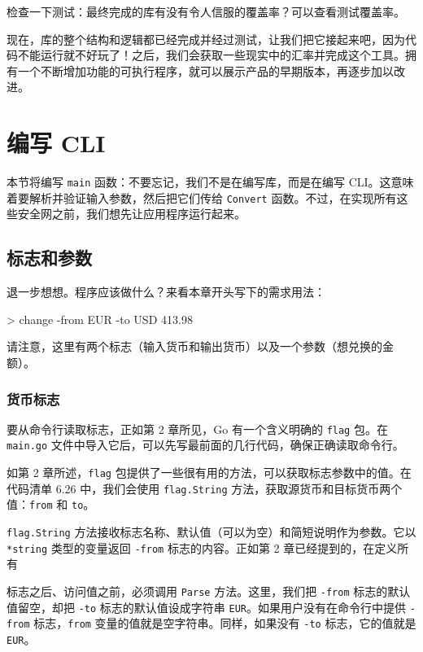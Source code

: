 检查一下测试：最终完成的库有没有令人信服的覆盖率？可以查看测试覆盖率。

现在，库的整个结构和逻辑都已经完成并经过测试，让我们把它接起来吧，因为代码不能运行就不好玩了！之后，我们会获取一些现实中的汇率并完成这个工具。拥有一个不断增加功能的可执行程序，就可以展示产品的早期版本，再逐步加以改进。

\section{编写 CLI}

本节将编写 \texttt{main} 函数：不要忘记，我们不是在编写库，而是在编写 CLI。这意味着要解析并验证输入参数，然后把它们传给 \texttt{Convert} 函数。不过，在实现所有这些安全网之前，我们想先让应用程序运行起来。

\subsection{标志和参数}

退一步想想。程序应该做什么？来看本章开头写下的需求用法：

\begin{shellcode}[]
> change -from EUR -to USD 413.98
\end{shellcode}

请注意，这里有两个标志（输入货币和输出货币）以及一个参数（想兑换的金额）。

\subsubsection*{货币标志}

要从命令行读取标志，正如第 2 章所见，Go 有一个含义明确的 \texttt{flag} 包。在 \texttt{main.go} 文件中导入它后，可以先写最前面的几行代码，确保正确读取命令行。

如第 2 章所述，\texttt{flag} 包提供了一些很有用的方法，可以获取标志参数中的值。在代码清单 6.26 中，我们会使用 \texttt{flag.String} 方法，获取源货币和目标货币两个值：\texttt{from} 和 \texttt{to}。

\texttt{flag.String} 方法接收标志名称、默认值（可以为空）和简短说明作为参数。它以 \texttt{*string} 类型的变量返回 \texttt{-from} 标志的内容。正如第 2 章已经提到的，在定义所有

标志之后、访问值之前，必须调用 \texttt{Parse} 方法。这里，我们把 \texttt{-from} 标志的默认值留空，却把 \texttt{-to} 标志的默认值设成字符串 \texttt{EUR}。如果用户没有在命令行中提供 \texttt{-from} 标志，\texttt{from} 变量的值就是空字符串。同样，如果没有 \texttt{-to} 标志，它的值就是 \texttt{EUR}。

